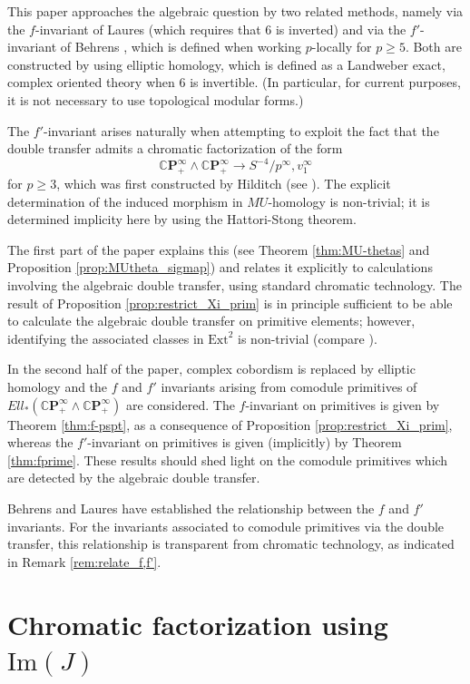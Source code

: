 \documentclass[10pt,a4paper]{amsart}
\theoremstyle{definition}
\theoremstyle{remark}
\newcommand{\ext}{\mathrm{Ext}}
\newcommand{\tmfcoeff}{{Ell}}
\newcommand{\cp}{\mathbb{C} \mathbf{P}^\infty}
\renewcommand{\smash}{\wedge}
\begin{document}
This paper approaches the algebraic question by two related methods, namely via the $f$-invariant of Laures \cite{laures} (which requires that $6$ is inverted) and via the $f'$-invariant of Behrens \cite{behrens}, which is defined when working $p$-locally for $p \geq 5$. Both are constructed by using elliptic homology, which is defined as a Landweber exact, complex oriented theory when $6$ is invertible. (In particular, for current purposes, it is not necessary to use topological modular forms.)

The $f'$-invariant  arises naturally when attempting to exploit the fact that the double transfer admits a chromatic factorization of the form
\[
	\cp_+ \smash \cp_+ \rightarrow S^{-4}/p^\infty, v_1 ^\infty
\]
for $p \geq 3$, which was first constructed by Hilditch (see \cite{BCGHRW}). The explicit determination of the induced morphism in $MU$-homology is non-trivial; it is determined implicity here by using  the Hattori-Stong theorem.

The first part of the paper explains this (see Theorem \ref{thm:MU-thetas} and Proposition \ref{prop:MUtheta_sigmap}) and relates it explicitly to calculations involving the algebraic double transfer, using standard chromatic technology. The result of Proposition \ref{prop:restrict_Xi_prim} is in principle sufficient to be able to calculate the algebraic double transfer on primitive elements; however, identifying the associated classes in $\ext^2$ is non-trivial (compare \cite{baker_transfer}).

In the second half of the paper, complex cobordism is replaced by elliptic homology and the $f$ and $f'$ invariants arising from comodule primitives of $\tmfcoeff_* (\cp_+ \smash \cp_+) $ are considered. The $f$-invariant on primitives is given by Theorem \ref{thm:f-pspt}, as a consequence of Proposition \ref{prop:restrict_Xi_prim}, whereas the $f'$-invariant on primitives is given (implicitly) by Theorem \ref{thm:fprime}. These results should shed light on the comodule primitives which are detected by the algebraic double transfer.

Behrens and Laures \cite{behrens_laures} have established the relationship between the $f$ and $f'$ invariants. For the invariants associated to comodule primitives via the double transfer, this relationship is transparent from chromatic technology, as indicated in Remark \ref{rem:relate_f,f'}.


\tableofcontents
%
\section{Chromatic factorization using $\mathrm{Im}(J)$}
\label{sect:hattori}
\end{document}
